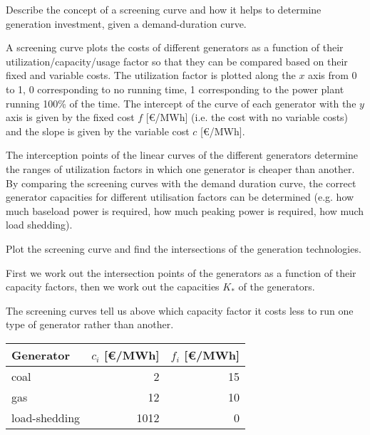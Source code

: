 \documentclass[11pt,a4paper,fleqn]{scrartcl}
\begin{document}
\begin{enumerate}[(a)]
 \begin{shaded}
  \item Describe the concept of a screening curve and how it helps to determine generation investment, given a demand-duration curve.
 \end{shaded}

 A screening curve plots the costs of different generators as a
 function of their utilization/capacity/usage factor so that they can
 be compared based on their fixed and variable costs. The utilization
 factor is plotted along the $x$ axis from 0 to 1, 0 corresponding to
 no running time, 1 corresponding to the power plant running 100\% of
 the time. The intercept of the curve of each generator with the $y$
 axis is given by the fixed cost $f$ [\euro/MWh] (i.e. the cost with no
 variable costs) and the slope is given by the variable cost $c$
 [\euro/MWh].

 The interception points of the linear curves of the different
 generators determine the ranges of utilization factors in which one
 generator is cheaper than another. By comparing the screening curves with the demand duration curve, the
 correct generator capacities for different utilisation factors can be
 determined (e.g. how much baseload power is required, how much peaking
 power is required, how much load shedding).

 \begin{shaded}\item Plot the screening curve and find the intersections of the generation technologies.\end{shaded}
 First we work out the intersection points of
 the generators as a function of their capacity factors, then we work out the
 capacities $K_*$ of the generators.

 The screening curves tell us above which capacity factor it costs less
 to run one type of generator rather than another.


 \begin{table}[!h]
  \centering
  \begin{tabular}{lrr}
   \toprule
   Generator     & $c_i$ [\euro/MWh] & $f_i$ [\euro/MWh] \\
   \midrule
   coal          & 2                 & 15                \\
   gas           & 12                & 10                \\
   load-shedding & 1012              & 0                 \\
   \bottomrule
  \end{tabular}
 \end{table}


\end{enumerate}
\end{document}
